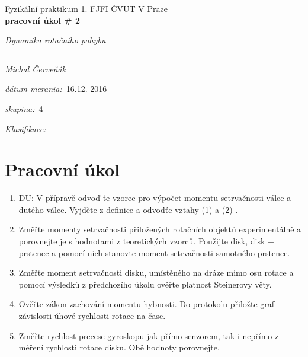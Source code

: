 \documentclass[a4paper,10pt]{article}
\begin{document}
\def\mean#1{\left< #1 \right>}
\noindent
{\large Fyzikální praktikum 1.} \hfil {\large FJFI ČVUT V Praze}\\
\noindent
{\large\textbf{pracovní úkol \# 2}}
\begin{center}
{\large\textit{Dynamika rotačního pohybu}}
\end{center}
\noindent
\rule{\textwidth}{1px}
\vspace{\baselineskip}

\emph{Michal Červeňák}
\par
\vspace{\baselineskip}
\begin{minipage}[l]{0.5\textwidth}%
\textit{dátum merania:}~16.12. 2016\\%
\par%
\noindent%
\textit{skupina:}~4\\%
\par%
\noindent%
\textit{Klasifikace:}\dotfill\\%
\end{minipage}

\section{Pracovní úkol}

\begin{enumerate}
\item DU: V přípravě odvoď ťe vzorec pro výpočet momentu setrvačnosti válce a dutého
válce. Vyjděte z definice a odvodťe vztahy (1) a (2) \cite{1}.
\item  Změřte momenty setrvačnosti přiložených rotačních objektů experimentálně a porovnejte je s
hodnotami z teoretických vzorců. Použijte disk, disk + prstenec a pomocí nich stanovte moment
setrvačnosti samotného prstence.
\item  Změřte moment setrvačnosti disku, umístěného na dráze mimo osu rotace a pomocí výsledků
z předchozího úkolu ověřte platnost Steinerovy věty.
\item  Ověřte zákon zachování momentu hybnosti. Do protokolu přiložte graf závislosti úhové rychlosti
rotace na čase.
\item  Změřte rychlost precese gyroskopu jak přímo senzorem, tak i nepřímo z měření rychlosti rotace
disku. Obě hodnoty porovnejte.
\end{enumerate}
\end{document}
